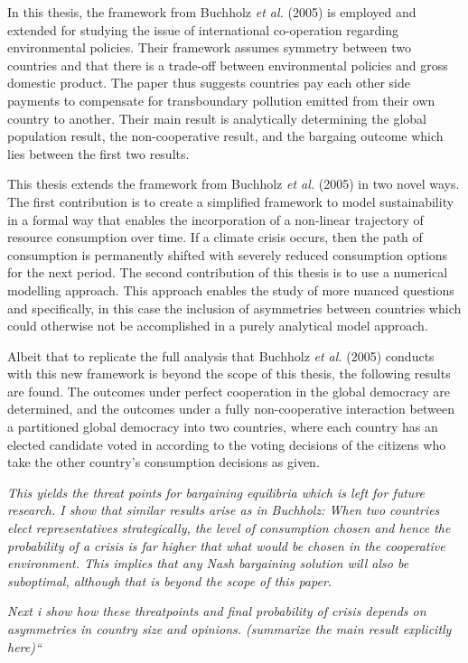 \documentclass[11pt,preprint, authoryear]{elsarticle}
\numberwithin{equation}{section}
\numberwithin{figure}{section}
\numberwithin{table}{section}
\begin{document}
In this thesis, the framework from Buchholz \emph{et al.} (2005) is
employed and extended for studying the issue of international
co-operation regarding environmental policies. Their framework assumes
symmetry between two countries and that there is a trade-off between
environmental policies and gross domestic product. The paper thus
suggests countries pay each other side payments to compensate for
transboundary pollution emitted from their own country to another. Their
main result is analytically determining the global population result,
the non-cooperative result, and the bargaing outcome which lies between
the first two results.

This thesis extends the framework from Buchholz \emph{et al.} (2005) in
two novel ways. The first contribution is to create a simplified
framework to model sustainability in a formal way that enables the
incorporation of a non-linear trajectory of resource consumption over
time. If a climate crisis occurs, then the path of consumption is
permanently shifted with severely reduced consumption options for the
next period. The second contribution of this thesis is to use a
numerical modelling approach. This approach enables the study of more
nuanced questions and specifically, in this case the inclusion of
asymmetries between countries which could otherwise not be accomplished
in a purely analytical model approach.

Albeit that to replicate the full analysis that Buchholz \emph{et al.}
(2005) conducts with this new framework is beyond the scope of this
thesis, the following results are found. The outcomes under perfect
cooperation in the global democracy are determined, and the outcomes
under a fully non-cooperative interaction between a partitioned global
democracy into two countries, where each country has an elected
candidate voted in according to the voting decisions of the citizens who
take the other country's consumption decisions as given.

\emph{This yields the threat points for bargaining equilibria which is
left for future research. I show that similar results arise as in
Buchholz: When two countries elect representatives strategically, the
level of consumption chosen and hence the probability of a crisis is far
higher that what would be chosen in the cooperative environment. This
implies that any Nash bargaining solution will also be suboptimal,
although that is beyond the scope of this paper.}

\emph{Next i show how these threatpoints and final probability of crisis
depends on asymmetries in country size and opinions. (summarize the main
result explicitly here)``}
\end{document}
